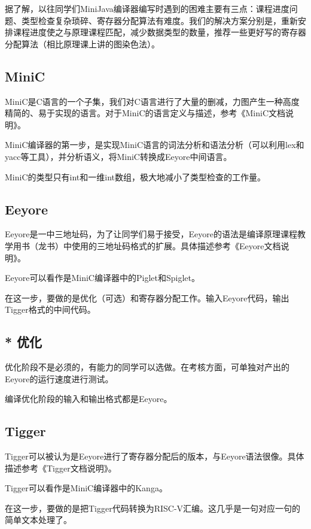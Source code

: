 \documentclass[a4paper]{ctexart}
\begin{document}
据了解，以往同学们MiniJava编译器编写时遇到的困难主要有三点：课程进度问题、类型检查复杂琐碎、寄存器分配算法有难度。我们的解决方案分别是，重新安排课程进度使之与原理课程匹配，减少数据类型的数量，推荐一些更好写的寄存器分配算法（相比原理课上讲的图染色法）。

\subsection{MiniC}

MiniC是C语言的一个子集，我们对C语言进行了大量的删减，力图产生一种高度精简的、易于实现的语言。对于MiniC的语言定义与描述，参考《MiniC文档说明》。

MiniC编译器的第一步，是实现MiniC语言的词法分析和语法分析（可以利用lex和yacc等工具），并分析语义，将MiniC转换成Eeyore中间语言。

MiniC的类型只有int和一维int数组，极大地减小了类型检查的工作量。

\subsection{Eeyore}

Eeyore是一中三地址码，为了让同学们易于接受，Eeyore的语法是编译原理课程教学用书（龙书）中使用的三地址码格式的扩展。具体描述参考《Eeyore文档说明》。

Eeyore可以看作是MiniC编译器中的Piglet和Spiglet。

在这一步，要做的是优化（可选）和寄存器分配工作。输入Eeyore代码，输出Tigger格式的中间代码。

\subsection{* 优化}

优化阶段不是必须的，有能力的同学可以选做。在考核方面，可单独对产出的Eeyore的运行速度进行测试。

编译优化阶段的输入和输出格式都是Eeyore。

\subsection{Tigger}

Tigger可以被认为是Eeyore进行了寄存器分配后的版本，与Eeyore语法很像。具体描述参考《Tigger文档说明》。

Tigger可以看作是MiniC编译器中的Kanga。

在这一步，要做的是把Tigger代码转换为RISC-V汇编。这几乎是一句对应一句的简单文本处理了。
\end{document}
